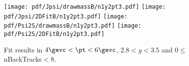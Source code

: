 \begin{figure}[H]
\begin{center}
\texttt{[image: pdf/Jpsi/drawmassB/n1y2pt3.pdf]}
\texttt{[image: pdf/Jpsi/2DFitB/n1y2pt3.pdf]}
\vspace*{-0.5cm}
\texttt{[image: pdf/Psi2S/drawmassB/n1y2pt3.pdf]}
\texttt{[image: pdf/Psi2S/2DFitB/n1y2pt3.pdf]}
\vspace*{-0.5cm}
\end{center}
\caption{Fit results in $4\gevc<\pt<6\gevc$, $2.8<y<3.5$ and 0$\leq$nBackTracks$<$8.}
\label{Fitn1y2pt3}
\end{figure}
